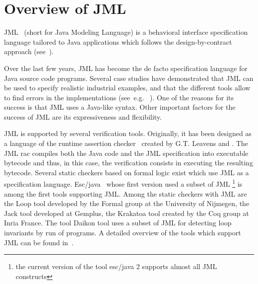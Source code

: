 


\section{Overview of JML} \label{BCSLprelim}
JML~\cite{JMLRefMan} (short for Java Modeling Language) is a behavioral interface specification 
language tailored to Java applications which follows the design-by-contract approach (see~\cite{M97oos}).

Over the last few years, JML has become the de facto specification language for
 Java source code programs. Several case studies have demonstrated that JML can be used to specify realistic
industrial examples, and that the different tools allow to find errors
in the implementations (see~e.g. \/~\cite{BreunesseCHJ04}). One
of the reasons for its success is that JML uses a Java-like
syntax.  Other important factors for the success of JML are its expressiveness and
flexibility.

JML is supported by several verification tools.
 Originally, it has been designed as a language of the runtime assertion checker~\cite{jmlrac} created by G.T. Leavens and . 
The JML rac compiles both the Java code and the JML specification into executable bytecode and thus, 
in this case, the verification consists in executing the resulting bytecode. Several static checkers based 
on formal logic exist which use JML as a specification language. Esc/java~\cite{escjava}  whose first version used a subset 
 of JML \footnote{the current version of the tool esc/java 2  supports almost all JML constructs} is among the first tools supporting JML.
Among the static checkers with JML  are
the Loop tool developed by the Formal group at the University of Nijmegen,
the Jack tool developed at Gemplus, the Krakatoa tool created by the Coq group at Inria France.
The tool Daikon \cite{ECG01DDL}  tool uses a subset of JML for detecting loop invariants by run of programs.
 A  detailed overview of the tools which support JML can  be found in~\cite{BurdyCCEKLLP03}.



